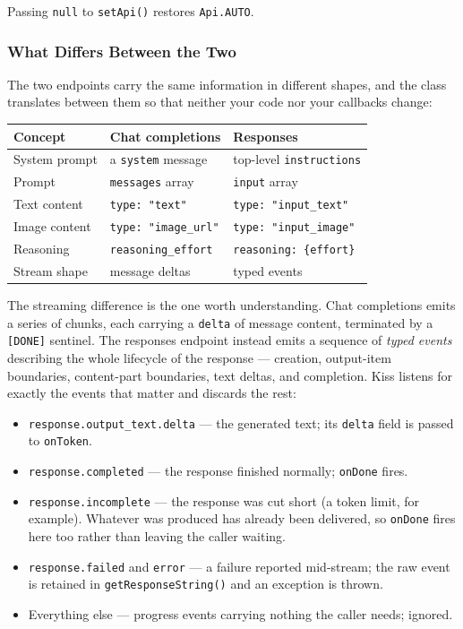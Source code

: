 \noindent
Passing \texttt{null} to \texttt{setApi()} restores \texttt{Api.AUTO}.

\subsubsection*{What Differs Between the Two}

The two endpoints carry the same information in different shapes, and the class translates between them so that neither your code nor your callbacks change:

\begin{longtable}{P{2.6cm}P{3.7cm}P{3.7cm}}
\toprule
\textbf{Concept} & \textbf{Chat completions} & \textbf{Responses} \\
\midrule
System prompt   & a \texttt{system} message   & top-level \texttt{instructions} \\
Prompt          & \texttt{messages} array     & \texttt{input} array \\
Text content    & \texttt{type: "text"}       & \texttt{type: "input\_text"} \\
Image content   & \texttt{type: "image\_url"} & \texttt{type: "input\_image"} \\
Reasoning       & \texttt{reasoning\_effort}  & \texttt{reasoning: \{effort\}} \\
Stream shape    & message deltas              & typed events \\
\bottomrule
\end{longtable}

\noindent
The streaming difference is the one worth understanding.  Chat completions emits a series of chunks, each carrying a \texttt{delta} of message content, terminated by a \texttt{[DONE]} sentinel.  The responses endpoint instead emits a sequence of \emph{typed events} describing the whole lifecycle of the response --- creation, output-item boundaries, content-part boundaries, text deltas, and completion.  Kiss listens for exactly the events that matter and discards the rest:

\begin{itemize}
  \item \texttt{response.output\_text.delta} --- the generated text; its \texttt{delta} field is passed to \texttt{onToken}.
  \item \texttt{response.completed} --- the response finished normally; \texttt{onDone} fires.
  \item \texttt{response.incomplete} --- the response was cut short (a token limit, for example).  Whatever was produced has already been delivered, so \texttt{onDone} fires here too rather than leaving the caller waiting.
  \item \texttt{response.failed} and \texttt{error} --- a failure reported mid-stream; the raw event is retained in \texttt{getResponseString()} and an exception is thrown.
  \item Everything else --- progress events carrying nothing the caller needs; ignored.
\end{itemize}

